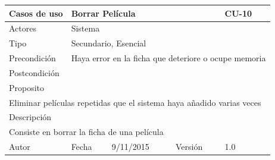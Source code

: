 \documentclass{article}
\begin{document}
\begin{table}[h]
\begin{tabular}{|l|l|l|l|l|l|}
\hline
\multicolumn{2}{|p{2cm}|}{Casos de uso}  & \multicolumn{3}{p{7cm}|}{Borrar Película} & CU-10 \\
\hline
\multicolumn{2}{|p{2cm}|}{Actores}       & \multicolumn{4}{p{8cm}|}{Sistema}        \\
\hline
\multicolumn{2}{|p{2cm}|}{Tipo}          & \multicolumn{4}{p{8cm}|}{Secundario, Esencial}        \\
\hline
\multicolumn{2}{|p{2cm}|}{Precondición}  & \multicolumn{4}{p{8cm}|}{Haya error en la ficha que deteriore o ocupe memoria}        \\
\hline
\multicolumn{2}{|p{2cm}|}{Postcondición} & \multicolumn{4}{p{8cm}|}{}        \\
\hline
\multicolumn{6}{|p{10cm}|}{Proposito}                                   \\
\hline
\multicolumn{6}{|p{10cm}|}{Eliminar películas repetidas que el sistema haya añadido varias veces}                                            \\
\hline
\multicolumn{6}{|p{10cm}|}{Descripción}                                 \\
\hline
\multicolumn{6}{|p{10cm}|}{Consiste en borrar la ficha de una película}                                            \\
\hline
Autor              &              & Fecha    & 9/11/2015    &   Versión  &1.0\\
\hline
\end{tabular}
\end{table}

\end{document}
